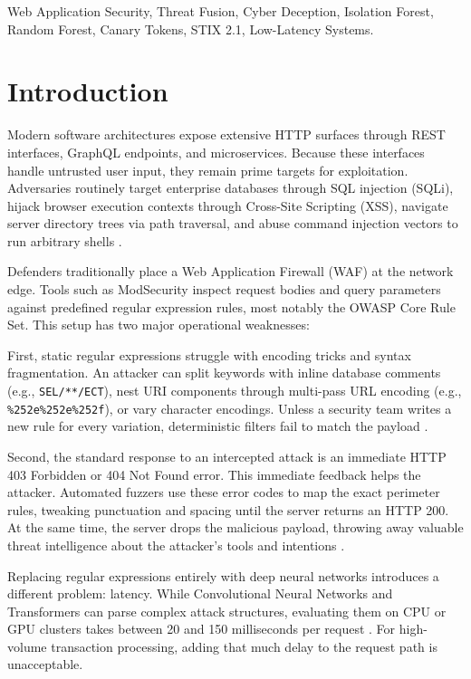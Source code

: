 \documentclass[conference]{IEEEtran}
\begin{document}
\begin{IEEEkeywords}
Web Application Security, Threat Fusion, Cyber Deception, Isolation Forest, Random Forest, Canary Tokens, STIX 2.1, Low-Latency Systems.
\end{IEEEkeywords}

\section{Introduction}
Modern software architectures expose extensive HTTP surfaces through REST interfaces, GraphQL endpoints, and microservices. Because these interfaces handle untrusted user input, they remain prime targets for exploitation. Adversaries routinely target enterprise databases through SQL injection (SQLi), hijack browser execution contexts through Cross-Site Scripting (XSS), navigate server directory trees via path traversal, and abuse command injection vectors to run arbitrary shells \cite{owasp}.

Defenders traditionally place a Web Application Firewall (WAF) at the network edge. Tools such as ModSecurity inspect request bodies and query parameters against predefined regular expression rules, most notably the OWASP Core Rule Set. This setup has two major operational weaknesses:

First, static regular expressions struggle with encoding tricks and syntax fragmentation. An attacker can split keywords with inline database comments (e.g., \texttt{SEL/**/ECT}), nest URI components through multi-pass URL encoding (e.g., \texttt{\%252e\%252e\%252f}), or vary character encodings. Unless a security team writes a new rule for every variation, deterministic filters fail to match the payload \cite{kruegel2003}.

Second, the standard response to an intercepted attack is an immediate HTTP 403 Forbidden or 404 Not Found error. This immediate feedback helps the attacker. Automated fuzzers use these error codes to map the exact perimeter rules, tweaking punctuation and spacing until the server returns an HTTP 200. At the same time, the server drops the malicious payload, throwing away valuable threat intelligence about the attacker's tools and intentions \cite{torrano2010}.

Replacing regular expressions entirely with deep neural networks introduces a different problem: latency. While Convolutional Neural Networks and Transformers can parse complex attack structures, evaluating them on CPU or GPU clusters takes between 20 and 150 milliseconds per request \cite{liang2021}. For high-volume transaction processing, adding that much delay to the request path is unacceptable.
\end{document}
